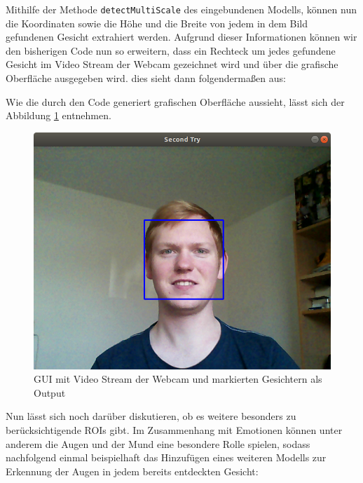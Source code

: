 \documentclass[12pt, a4paper]{report}
\begin{document}

Mithilfe der Methode \texttt{detectMultiScale} des eingebundenen Modells, können nun die Koordinaten sowie die Höhe und die Breite von jedem in dem Bild gefundenen Gesicht extrahiert werden. Aufgrund dieser Informationen können wir den bisherigen Code nun so erweitern, dass ein Rechteck um jedes gefundene Gesicht im Video Stream der Webcam gezeichnet wird und über die grafische Oberfläche ausgegeben wird. dies sieht dann folgendermaßen aus:\newline

Wie die durch den Code generiert grafischen Oberfläche aussieht, lässt sich der Abbildung \ref{fig:Input GUI 2} entnehmen.
\begin{figure}[h]
\includegraphics[width=\linewidth]{Bilder/InputGUI2.png}
\caption{GUI mit Video Stream der Webcam und markierten Gesichtern als Output}
\label{fig:Input GUI 2}
\end{figure}
Nun lässt sich noch darüber diskutieren, ob es weitere besonders zu berücksichtigende ROIs gibt. Im Zusammenhang mit Emotionen können unter anderem die Augen und der Mund eine besondere Rolle spielen, sodass nachfolgend einmal beispielhaft das Hinzufügen eines weiteren Modells zur Erkennung der Augen in jedem bereits entdeckten Gesicht:

\end{document}
